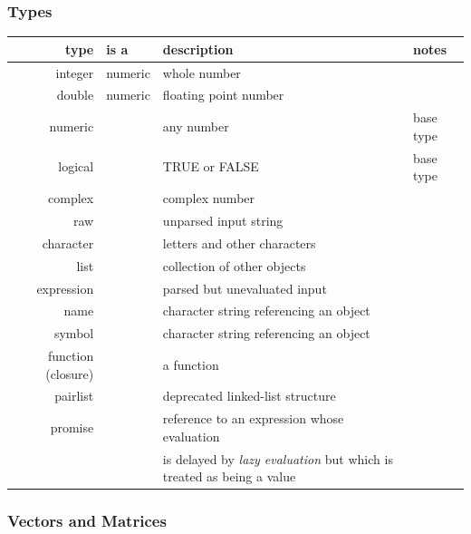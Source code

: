 \documentclass[10pt,letterpaper]{article}
\begin{document}
\subsubsection{Types} %
\label{ssub:types}
\begin{tabular}{r l l l}
    type & is a  & description  &  notes \\
    \hline
    integer & numeric & whole number  &       \\
    double  & numeric & floating point number       &       \\
    numeric &       &   any number    & base type       \\
    logical &        & TRUE or FALSE   & base type \\
    complex &       & complex number &       \\
    raw     &       & unparsed input string  &       \\
    character &       & letters and other characters &       \\
    list &       & collection of other objects &       \\
    expression &       & parsed but unevaluated input &       \\
    name     &       & character string referencing an object &       \\
    symbol &       & character string referencing an object  &       \\
    function (closure) &   & a function  &       \\
    pairlist &       & deprecated linked-list structure &       \\
    promise &       & reference to an expression whose evaluation & \\
    & & is delayed by \emph{lazy evaluation} but which is treated as being a value &       \\
\end{tabular}


\subsubsection{Vectors and Matrices} %
\label{ssub:vectors}
\end{document}
